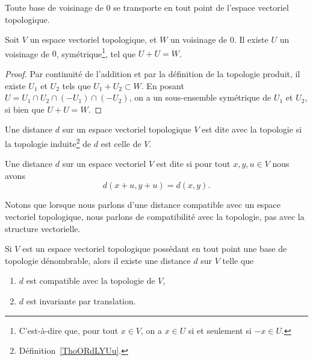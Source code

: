 \begin{corollary}\label{PropInvarianceTopologie}
  Toute base de voisinage de \( 0 \) se transporte en tout point de l'espace vectoriel topologique.
\end{corollary}

\begin{lemma}\label{PropSommeTopologique}
  Soit \( V \) un espace vectoriel topologique, et \( W \) un voisinage de \( 0 \). Il existe \( U \) un voisinage de \( 0 \), symétrique\footnote{C'est-à-dire que, pour tout \( x \in V \), on a \( x \in U \) si et seulement si \( -x \in U \).}, tel que \( U + U = W \).
\end{lemma}

\begin{proof}
  Par continuité de l'addition et par la définition de la topologie produit, il existe \(U_1 \) et \(U_2 \) tels que \( U_1 + U_2 \subset W \). En posant \( U = U_1 \cap U_2 \cap (-U_1) \cap (-U_2) \), on a un sous-ensemble symétrique de \( U_1\) et \(U_2\), si bien que \( U + U = W \).
\end{proof}

\begin{definition}      \label{DEFooGTOZooRcvGHg}
    Une distance \( d\) sur un espace vectoriel topologique \( V\) est dite  avec la topologie si la topologie induite\footnote{Définition~\ref{ThoORdLYUu}.} de \( d\) est celle de \( V\).

    Une distance \( d\) sur un espace vectoriel \( V\) est dite  si pour tout \( x,y,u\in V\) nous avons
    \begin{equation}
        d(x+u,y+u)=d(x,y).
    \end{equation}
\end{definition}
Notons que lorsque nous parlons d'une distance compatible avec un espace vectoriel topologique, nous parlons de compatibilité avec la topologie, pas avec la structure vectorielle.

\begin{theorem}      \label{THOooAGBXooZnvQLK}
    Si $V$ est un espace vectoriel topologique possédant en tout point une base de topologie dénombrable, alors il existe une distance \( d\) sur \( V\) telle que
    \begin{enumerate}
        \item
            \( d\) est compatible avec la topologie de \( V\),
        \item
            \( d\) est invariante par translation.
    \end{enumerate}
\end{theorem}

